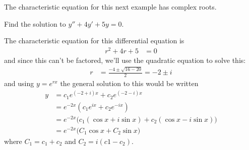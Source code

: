 The characteristic equation for this next example has complex roots.  

\begin{example}
Find the solution to $y'' + 4y' +5y=0$. 

\solution

The characteristic equation for this differential equation is
%
\begin{align*}
r^2 + 4r + 5 & = 0 
\end{align*}
and since this can't be factored, we'll use the quadratic equation to solve this:
%
\begin{align*}
r & = \frac{-4 \pm \sqrt{16-20}}{2} = -2 \pm i 
\end{align*}
and  using $y=e^{rx}$ the general solution to this would be written
%
\begin{align*}
y & = c_1 e^{(-2 + i)x} + c_2 e^{(-2-i)x}\\
& = e^{-2x} (c_1 e^{ix} + c_2 e^{-ix}) \\
& = e^{-2x} \bigl( c_1 (\cos x + i \sin x) + c_2 (\cos x - i \sin x) \bigr) \\
& = e^{-2x} \bigl( C_1 \cos x + C_2 \sin x \bigr)
\end{align*}
where $C_1 = c_1+c_2$ and $C_2 = i (c1-c_2)$.  
\end{example}

